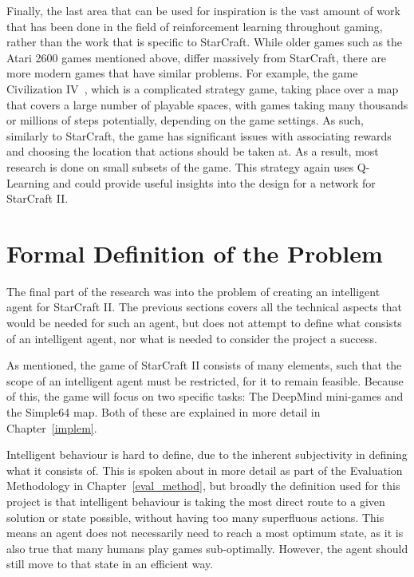 Finally, the last area that can be used for inspiration is the vast amount of
work that has been done in the field of reinforcement learning throughout gaming,
rather than the work that is specific to StarCraft. While older games such as
the Atari 2600 games mentioned above, differ massively from StarCraft, there are
more modern games that have similar problems. For example, the game
Civilization IV~\cite{wender2008using}, which is a complicated strategy game,
taking place over a map that covers a large number of playable spaces, with
games taking many thousands or millions of steps potentially, depending on the
game settings. As such, similarly to StarCraft, the game has significant issues
with associating rewards and choosing the location that actions should be taken
at. As a result, most research is done on small subsets of the game. This
strategy again uses Q-Learning and could provide useful insights into the
design for a network for StarCraft II\@.


\section{Formal Definition of the Problem}

The final part of the research was into the problem of creating an intelligent
agent for StarCraft II\@. The previous sections covers all the technical aspects
that would be needed for such an agent, but does not attempt to define what
consists of an intelligent agent, nor what is needed to consider the project a
success.

As mentioned, the game of StarCraft II consists of many elements, such that the
scope of an intelligent agent must be restricted, for it to remain feasible.
Because of this, the game will focus on two specific tasks: The DeepMind
mini-games and the Simple64 map. Both of these are explained in more detail in
Chapter~\ref{implem}.

Intelligent behaviour is hard to define, due to the inherent subjectivity in
defining what it consists of. This is spoken about in more detail as part of the
Evaluation Methodology in Chapter~\ref{eval_method}, but broadly the definition
used for this project is that intelligent behaviour is taking the most direct
route to a given solution or state possible, without having too many superfluous
actions. This means an agent does not necessarily need to reach a most optimum
state, as it is also true that many humans play games sub-optimally. However,
the agent should still move to that state in an efficient way.

